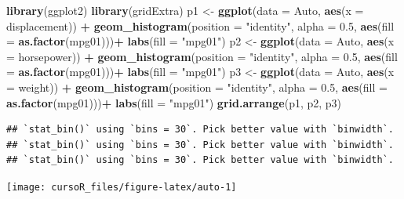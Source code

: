 \documentclass[]{book}
\newenvironment{Shaded}{\begin{snugshade}}{\end{snugshade}}
\newcommand{\KeywordTok}[1]{\textcolor[rgb]{0.13,0.29,0.53}{\textbf{#1}}}
\newcommand{\DataTypeTok}[1]{\textcolor[rgb]{0.13,0.29,0.53}{#1}}
\newcommand{\FloatTok}[1]{\textcolor[rgb]{0.00,0.00,0.81}{#1}}
\newcommand{\StringTok}[1]{\textcolor[rgb]{0.31,0.60,0.02}{#1}}
\newcommand{\OperatorTok}[1]{\textcolor[rgb]{0.81,0.36,0.00}{\textbf{#1}}}
\newcommand{\NormalTok}[1]{#1}
\begin{document}
\begin{Shaded}
\begin{Highlighting}[]
\KeywordTok{library}\NormalTok{(ggplot2)}
\KeywordTok{library}\NormalTok{(gridExtra)}
\NormalTok{p1 <-}\StringTok{ }\KeywordTok{ggplot}\NormalTok{(}\DataTypeTok{data =}\NormalTok{ Auto, }\KeywordTok{aes}\NormalTok{(}\DataTypeTok{x =}\NormalTok{ displacement)) }\OperatorTok{+}\StringTok{ }\KeywordTok{geom_histogram}\NormalTok{(}\DataTypeTok{position =} \StringTok{"identity"}\NormalTok{,}
\DataTypeTok{alpha =} \FloatTok{0.5}\NormalTok{,}
\KeywordTok{aes}\NormalTok{(}\DataTypeTok{fill =} \KeywordTok{as.factor}\NormalTok{(mpg01)))}\OperatorTok{+}\StringTok{ }\KeywordTok{labs}\NormalTok{(}\DataTypeTok{fill =} \StringTok{"mpg01"}\NormalTok{)}
\NormalTok{p2 <-}\StringTok{ }\KeywordTok{ggplot}\NormalTok{(}\DataTypeTok{data =}\NormalTok{ Auto, }\KeywordTok{aes}\NormalTok{(}\DataTypeTok{x =}\NormalTok{ horsepower)) }\OperatorTok{+}\StringTok{ }\KeywordTok{geom_histogram}\NormalTok{(}\DataTypeTok{position =} \StringTok{"identity"}\NormalTok{,}
\DataTypeTok{alpha =} \FloatTok{0.5}\NormalTok{,}
\KeywordTok{aes}\NormalTok{(}\DataTypeTok{fill =} \KeywordTok{as.factor}\NormalTok{(mpg01)))}\OperatorTok{+}\StringTok{ }\KeywordTok{labs}\NormalTok{(}\DataTypeTok{fill =} \StringTok{"mpg01"}\NormalTok{)}
\NormalTok{p3 <-}\StringTok{ }\KeywordTok{ggplot}\NormalTok{(}\DataTypeTok{data =}\NormalTok{ Auto, }\KeywordTok{aes}\NormalTok{(}\DataTypeTok{x =}\NormalTok{ weight)) }\OperatorTok{+}\StringTok{ }\KeywordTok{geom_histogram}\NormalTok{(}\DataTypeTok{position =} \StringTok{"identity"}\NormalTok{,}
\DataTypeTok{alpha =} \FloatTok{0.5}\NormalTok{,}
\KeywordTok{aes}\NormalTok{(}\DataTypeTok{fill =} \KeywordTok{as.factor}\NormalTok{(mpg01)))}\OperatorTok{+}\StringTok{ }\KeywordTok{labs}\NormalTok{(}\DataTypeTok{fill =} \StringTok{"mpg01"}\NormalTok{)}
\KeywordTok{grid.arrange}\NormalTok{(p1, p2, p3)}
\end{Highlighting}
\end{Shaded}

\begin{verbatim}
## `stat_bin()` using `bins = 30`. Pick better value with `binwidth`.
## `stat_bin()` using `bins = 30`. Pick better value with `binwidth`.
## `stat_bin()` using `bins = 30`. Pick better value with `binwidth`.
\end{verbatim}

\begin{center}\texttt{[image: cursoR\_files/figure-latex/auto-1]} \end{center}
\end{document}
